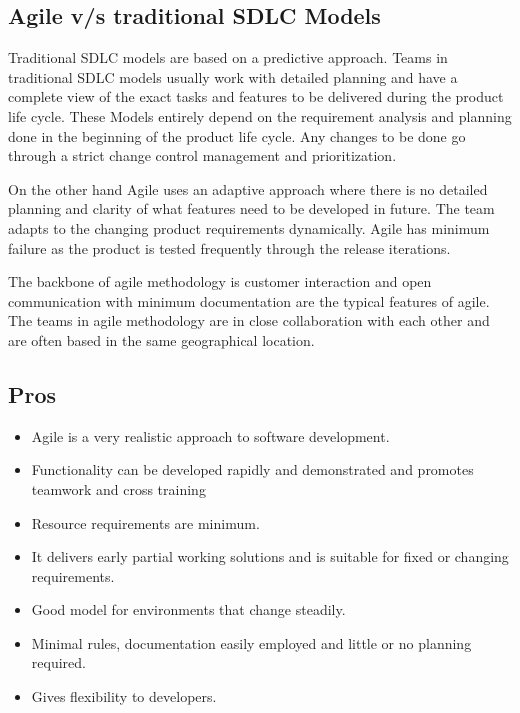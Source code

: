\subsection{Agile v/s traditional SDLC Models}

Traditional SDLC models are based on a predictive approach. Teams in traditional SDLC models 
usually work with detailed planning and have a complete view of the exact tasks and features 
to be delivered during the product life cycle. These Models entirely depend on the requirement 
analysis and planning done in the beginning of the product life cycle. Any changes to be done go 
through a strict change control management and prioritization.

On the other hand Agile uses an adaptive approach where there is no detailed planning and clarity
of what features need to be developed in future. The team adapts to the  changing product requirements 
dynamically. Agile has minimum failure as the product is tested frequently through the release iterations.

The backbone of agile methodology is customer interaction  and open communication with minimum 
documentation are the typical features of agile. The teams in agile methodology are in close collaboration 
with each other and are often based in the same geographical location.

\subsection{Pros}
\begin{itemize}
    \item Agile is a very realistic approach to software development.
    \item Functionality can be developed rapidly and demonstrated and promotes teamwork and cross training 
    \item Resource requirements are minimum.
    \item It delivers early partial working solutions and is suitable for fixed or changing requirements.
    \item Good model for environments that change steadily.
    \item Minimal rules, documentation easily employed and little or no planning required.
    \item Gives flexibility to developers.
\end{itemize}

